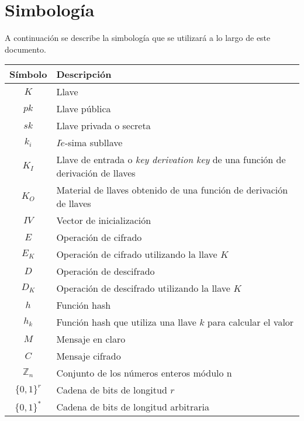 %
%

\section*{Simbología}

A continuación se describe la simbología que se utilizará a lo largo de
este documento.

\begin{table}[H]
  \begin{center}
    \begin{tabular}{c|l}
      \hline
      Símbolo & Descripción \\
      \hline
      $K$ & Llave \\
      \hline
      $pk$ & Llave pública \\
      \hline
      $sk$ & Llave privada o secreta \\
      \hline
      $k_i$ & $I\acute{e}$-sima subllave \\
      \hline
      $K_I$ & Llave de entrada o \textit{key derivation key} de una función
      de derivación de llaves \\
      \hline
      $K_O$ & Material de llaves obtenido de una función de derivación de llaves \\
      \hline
      $IV$ & Vector de inicialización \\
      \hline
      $E$ & Operación de cifrado \\
      \hline
      $E_K$ & Operación de cifrado utilizando la llave $K$ \\
      \hline
      $D$ & Operación de descifrado \\
      \hline
      $D_K$ & Operación de descifrado utilizando la llave $K$ \\
      \hline
      $h$ & Función hash \\
      \hline
      $h_k$ & Función hash que utiliza una llave $k$ para calcular el valor\\
      \hline
      $M$ & Mensaje en claro\\
      \hline
      $C$ & Mensaje cifrado\\
      \hline
      $\mathbb{Z}_n$ & Conjunto de los números enteros módulo n\\
      \hline
      $\{0,1\}^r$ & Cadena de bits de longitud $r$ \\
      \hline
      $\{0,1\}^*$ & Cadena de bits de longitud arbitraria \\

\end{tabular}
\end{center}
\end{table}
